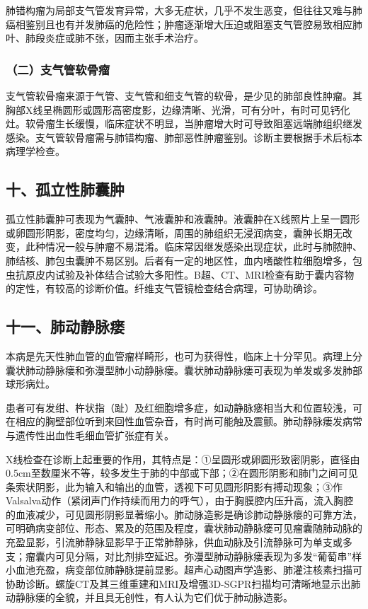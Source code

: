 肺错构瘤为局部支气管发育异常，大多无症状，几乎不发生恶变，但往往又难与肺癌相鉴别且也有并发肺癌的危险性；肿瘤逐渐增大压迫或阻塞支气管腔易致相应肺叶、肺段炎症或肺不张，因而主张手术治疗。

\subsubsection{（二）支气管软骨瘤}

支气管软骨瘤来源于气管、支气管和细支气管的软骨，是少见的肺部良性肿瘤。其胸部X线呈椭圆形或圆形高密度影，边缘清晰、光滑，可有分叶，有时可见钙化灶。软骨瘤生长缓慢，临床症状不明显，当肿瘤增大时可导致阻塞远端肺组织继发感染。支气管软骨瘤需与肺错构瘤、肺部恶性肿瘤鉴别。诊断主要根据手术后标本病理学检查。

\subsection{十、孤立性肺囊肿}

孤立性肺囊肿可表现为气囊肿、气液囊肿和液囊肿。液囊肿在X线照片上呈一圆形或卵圆形阴影，密度均匀，边缘清晰，周围的肺组织无浸润病变，囊肿长期无改变，此种情况一般与肿瘤不易混淆。临床常因继发感染出现症状，此时与肺脓肿、肺结核、肺包虫囊肿不易区别。后者有一定的地区性，血内嗜酸性粒细胞增多，包虫抗原皮内试验及补体结合试验大多阳性。B超、CT、MRI检查有助于囊内容物的定性，有较高的诊断价值。纤维支气管镜检查结合病理，可协助确诊。

\subsection{十一、肺动静脉瘘}

本病是先天性肺血管的血管瘤样畸形，也可为获得性，临床上十分罕见。病理上分囊状肺动静脉瘘和弥漫型肺小动静脉瘘。囊状肺动静脉瘘可表现为单发或多发肺部球形病灶。

患者可有发绀、杵状指（趾）及红细胞增多症，如动静脉瘘相当大和位置较浅，可在相应的胸壁部位听到来回性血管杂音，有时尚可能触及震颤。肺动静脉瘘发病常与遗传性出血性毛细血管扩张症有关。

X线检查在诊断上起重要的作用，其特点是：①呈圆形或卵圆形致密阴影，直径由0.5cm至数厘米不等，较多发生于肺的中部或下部；②在圆形阴影和肺门之间可见条索状阴影，此为输入和输出的血管，透视下可见圆形阴影有搏动现象；③作Valsalva动作（紧闭声门作持续而用力的呼气），由于胸膜腔内压升高，流入胸腔的血液减少，可见圆形阴影显著缩小。肺动脉造影是确诊肺动静脉瘘的可靠方法，可明确病变部位、形态、累及的范围及程度，囊状肺动静脉瘘可见瘤囊随肺动脉的充盈显影，引流肺静脉显影早于正常肺静脉，供血动脉及引流静脉可为单支或多支；瘤囊内可见分隔，对比剂排空延迟。弥漫型肺动静脉瘘表现为多发“葡萄串”样小血池充盈，病变部位肺静脉提前显影。超声心动图声学造影、肺灌注核素扫描可协助诊断。螺旋CT及其三维重建和MRI及增强3D-SGPR扫描均可清晰地显示出肺动静脉瘘的全貌，并且具无创性，有人认为它们优于肺动脉造影。

